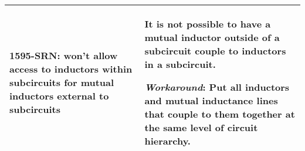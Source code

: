 {\begin{longtable}[h] {>{\raggedright\small}m{2in}|>{\raggedright\let\\\tabularnewline\small}m{3.5in}}
\textbf{1595-SRN}: \Xyce{} won't allow access to inductors within subcircuits
for mutual inductors external to subcircuits & It is not possible to
have a mutual inductor outside of a subcircuit couple to inductors in
a subcircuit.

\textbf{\textit{Workaround}}: Put all inductors and mutual inductance lines
that couple to them together at the same level of circuit hierarchy.
\\ \hline

\end{longtable}
}
